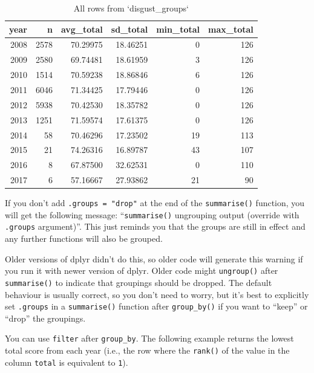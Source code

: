 \documentclass[
  oneside]{book}
\begin{document}
\begin{table}

\caption{\label{tab:group-by}All rows from `disgust_groups`}
\centering
\begin{tabular}[t]{r|r|r|r|r|r}
\hline
year & n & avg\_total & sd\_total & min\_total & max\_total\\
\hline
2008 & 2578 & 70.29975 & 18.46251 & 0 & 126\\
\hline
2009 & 2580 & 69.74481 & 18.61959 & 3 & 126\\
\hline
2010 & 1514 & 70.59238 & 18.86846 & 6 & 126\\
\hline
2011 & 6046 & 71.34425 & 17.79446 & 0 & 126\\
\hline
2012 & 5938 & 70.42530 & 18.35782 & 0 & 126\\
\hline
2013 & 1251 & 71.59574 & 17.61375 & 0 & 126\\
\hline
2014 & 58 & 70.46296 & 17.23502 & 19 & 113\\
\hline
2015 & 21 & 74.26316 & 16.89787 & 43 & 107\\
\hline
2016 & 8 & 67.87500 & 32.62531 & 0 & 110\\
\hline
2017 & 6 & 57.16667 & 27.93862 & 21 & 90\\
\hline
\end{tabular}
\end{table}

\begin{warning}
If you don't add \texttt{.groups\ =\ "drop"} at the end of the \texttt{summarise()} function, you will get the following message: ``\texttt{summarise()} ungrouping output (override with \texttt{.groups} argument)''. This just reminds you that the groups are still in effect and any further functions will also be grouped.

Older versions of dplyr didn't do this, so older code will generate this warning if you run it with newer version of dplyr. Older code might \texttt{ungroup()} after \texttt{summarise()} to indicate that groupings should be dropped. The default behaviour is usually correct, so you don't need to worry, but it's best to explicitly set \texttt{.groups} in a \texttt{summarise()} function after \texttt{group\_by()} if you want to ``keep'' or ``drop'' the groupings.

\end{warning}

You can use \texttt{filter} after \texttt{group\_by}. The following example returns the lowest total score from each year (i.e., the row where the \texttt{rank()} of the value in the column \texttt{total} is equivalent to \texttt{1}).
\end{document}
